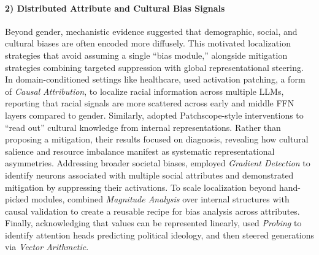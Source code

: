 \documentclass[11pt,letterpaper]{mystyle}
\begin{document}
  \paragraph{2) Distributed Attribute and Cultural Bias Signals}
  Beyond gender, mechanistic evidence suggested that demographic, social, and cultural biases are often encoded more diffusely. This motivated localization strategies that avoid assuming a single “bias module,” alongside mitigation strategies combining targeted suppression with global representational steering.
  In domain-conditioned settings like healthcare, \citet{ahsanElucidatingMechanismsDemographic2025} used activation patching, a form of \textit{Causal Attribution}, to localize racial information across multiple LLMs, reporting that racial signals are more scattered across early and middle FFN layers compared to gender. Similarly, \citet{yuEntangledRepresentationsMechanistic2025} adopted Patchscope-style interventions to “read out” cultural knowledge from internal representations. Rather than proposing a mitigation, their results focused on diagnosis, revealing how cultural salience and resource imbalance manifest as systematic representational asymmetries.
  Addressing broader societal biases, \citet{liuDevilNeuronsInterpreting2024} employed \textit{Gradient Detection} to identify neurons associated with multiple social attributes and demonstrated mitigation by suppressing their activations. To scale localization beyond hand-picked modules, \citet{chandnaDissectingBiasLLMs2025} combined \textit{Magnitude Analysis} over internal structures with causal validation to create a reusable recipe for bias analysis across attributes. Finally, acknowledging that values can be represented linearly, \citet{kimLinearRepresentationsPolitical2024} used \textit{Probing} to identify attention heads predicting political ideology, and then steered generations via \textit{Vector Arithmetic}.
  
\end{document}
